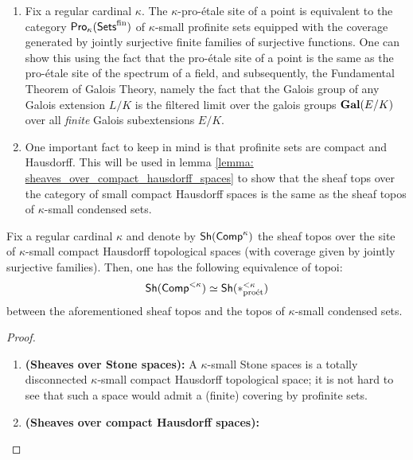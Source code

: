                 \begin{remark} \label{remark: condensation_and_profiniteness}
                    \noindent
                    \begin{enumerate}
                        \item Fix a regular cardinal $\kappa$. The $\kappa$-pro-\'etale site of a point is equivalent to the category $\mathsf{Pro}_{\kappa}(\mathsf{Sets}^{\mathrm{fin}})$ of $\kappa$-small profinite sets equipped with the coverage generated by jointly surjective finite families of surjective functions. One can show this using the fact that the pro-\'etale site of a point is the same as the pro-\'etale site of the spectrum of a field, and subsequently, the Fundamental Theorem of Galois Theory, namely the fact that the Galois group of any Galois extension $L/K$ is the filtered limit over the galois groups $\mathbf{Gal}(E/K)$ over all \textit{finite} Galois subextensions $E/K$.
                        \item One important fact to keep in mind is that profinite sets are compact and Hausdorff. This will be used in lemma \ref{lemma: sheaves_over_compact_hausdorff_spaces} to show that the sheaf tops over the category of small compact Hausdorff spaces is the same as the sheaf topos of $\kappa$-small condensed sets.
                    \end{enumerate}
                \end{remark}
                
                \begin{lemma} \label{lemma: sheaves_over_compact_hausdorff_spaces}
                    Fix a regular cardinal $\kappa$ and denote by $\mathsf{Sh}(\mathsf{Comp}^{\kappa})$ the sheaf topos over the site of $\kappa$-small compact Hausdorff topological spaces (with coverage given by jointly surjective families). Then, one has the following equivalence of topoi:
                        $$\mathsf{Sh}(\mathsf{Comp}^{< \kappa}) \simeq \mathsf{Sh}(*_{\mathrm{pro\acute{e}t}}^{< \kappa})$$
                    between the aforementioned sheaf topos and the topos of $\kappa$-small condensed sets.
                \end{lemma}
                    \begin{proof}
                        \noindent
                        \begin{enumerate}
                            \item \textbf{(Sheaves over Stone spaces):} A $\kappa$-small Stone spaces is a totally disconnected $\kappa$-small compact Hausdorff topological space; it is not hard to see that such a space would admit a (finite) covering by profinite sets. 
                            \item \textbf{(Sheaves over compact Hausdorff spaces):}
                        \end{enumerate}
                    \end{proof}
                
